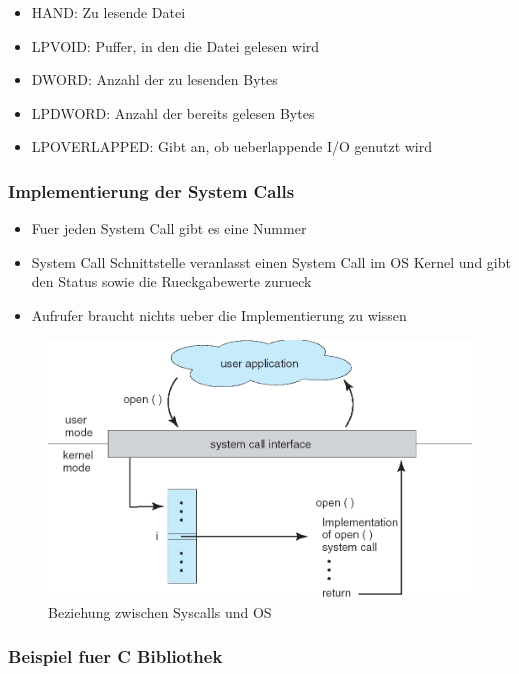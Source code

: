 \documentclass[a4paper]{scrreprt}
\begin{document}
\begin{itemize}
	\item HAND: Zu lesende Datei
	\item LPVOID: Puffer, in den die Datei gelesen wird
	\item DWORD: Anzahl der zu lesenden Bytes
	\item LPDWORD: Anzahl der bereits gelesen Bytes
	\item LPOVERLAPPED: Gibt an, ob ueberlappende I/O genutzt wird
\end{itemize}

\subsubsection{Implementierung der System Calls}
\begin{itemize}
	\item Fuer jeden System Call gibt es eine Nummer
	\item System Call Schnittstelle veranlasst einen System Call im OS Kernel und gibt den Status sowie die Rueckgabewerte zurueck
	\item Aufrufer braucht nichts ueber die Implementierung zu wissen
\end{itemize}

\begin{figure}[ht]
\centering
\includegraphics[scale=0.4]{graphics/syscall_os_relationship.png}
\caption{Beziehung zwischen Syscalls und OS}
\end{figure}

\subsubsection{Beispiel fuer C Bibliothek}
\end{document}
